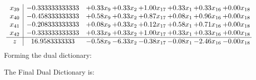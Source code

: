 \documentclass[8pt]{article}
\begin{document}
\[\begin{array}{c| c c@{\hskip 2pt} c@{\hskip 2pt} c@{\hskip 2pt} c@{\hskip 2pt} c@{\hskip 2pt} c@{\hskip 2pt} }
 x_{39}   &  -0.333333333333 & +  0.33 x_{9} & +  0.33 x_{2} & +  1.00 x_{17} & +  0.33 x_{1} & +  0.33 x_{16} & +  0.00 x_{18}\\
 x_{40}   &  -0.458333333333 & +  0.58 x_{9} & +  0.33 x_{2} & +  0.87 x_{17} & +  0.08 x_{1} & +  0.96 x_{16} & +  0.00 x_{18}\\
 x_{41}   &  -0.208333333333 & +  0.08 x_{9} & +  0.33 x_{2} & +  0.12 x_{17} & +  0.58 x_{1} & +  0.71 x_{16} & +  0.00 x_{18}\\
 x_{42}   &  -0.333333333333 & +  0.33 x_{9} & +  0.33 x_{2} & +  1.00 x_{17} & +  0.33 x_{1} & +  0.33 x_{16} & +  0.00 x_{18}\\
\hline
z    &  16.9583333333 & -0.58 x_{9} & -6.33 x_{2} & -0.38 x_{17} & -0.08 x_{1} & -2.46 x_{16} & -0.00 x_{18}\\
\end{array}\]
Forming the dual dictionary:

The Final Dual Dictionary is: 
\end{document}
